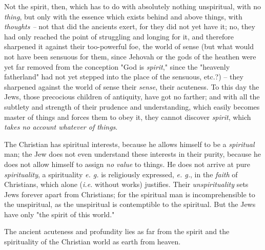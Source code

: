 Not the spirit, then, which has to do with absolutely nothing unspiritual, 
with no \textit{thing}, but only with the essence which exists behind and 
above things, with \textit{thoughts --} not that did the ancients exert, for 
they did not yet have it; no, they had only reached the point of struggling 
and longing for it, and therefore sharpened it against their too-powerful foe, 
the world of sense (but what would not have been sensuous for them, since 
Jehovah or the gods of the heathen were yet far removed from the conception 
"{}God is \textit{spirit},"{} since the "{}heavenly fatherland"{} had not yet 
stepped into the place of the sensuous, etc.?) -- they sharpened against the 
world of sense their \textit{sense}, their acuteness. To this day the Jews, 
those precocious children of antiquity, have got no farther; and with all the 
subtlety and strength of their prudence and understanding, which easily 
becomes master of things and forces them to obey it, they cannot discover 
\textit{spirit}, which \textit{takes no account whatever of things}.

The Christian has spiritual interests, because he allows himself to be a 
\textit{spiritual} man; the Jew does not even understand these interests in 
their purity, because he does not allow himself to assign \textit{no value} to 
things. He does not arrive at pure \textit{spirituality}, a spirituality 
\textit{e. g.} is religiously expressed, \textit{e. g.}, in the \textit{faith} 
of Christians, which alone (\textit{i.e.} without works) justifies. Their 
\textit{unspirituality} sets Jews forever apart from Christians; for the 
spiritual man is incomprehensible to the unspiritual, as the unspiritual is 
contemptible to the spiritual. But the Jews have only "{}the spirit of this 
world."{}

The ancient acuteness and profundity lies as far from the spirit and the 
spirituality of the Christian world as earth from heaven.

